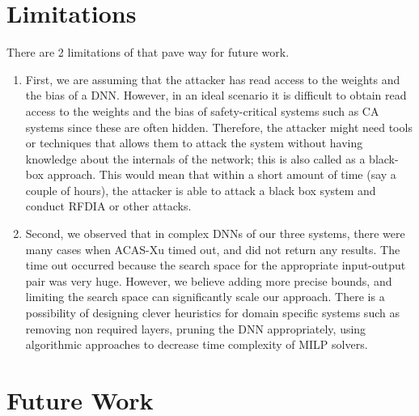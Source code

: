 \section{ Limitations}

There are 2 limitations of \tool that pave way for future work. 
\begin{enumerate}
	\item First, we are assuming that the attacker has read access to the weights and the bias of a \ac{DNN}.
	However, in an ideal scenario it is difficult to obtain read access to the weights and the bias of safety-critical systems such as \ac{CA} systems since these are often hidden.
	Therefore, the attacker might need tools or techniques that allows them to attack the system without having knowledge about the internals of the network; this is also called as a black-box approach. 
	This would mean that within a short amount of time (say a couple of hours), the attacker is able to attack a black box system and conduct \ac{RFDIA} or other attacks. 
	\item Second, we observed that in complex \ac{DNN}s of our three systems, there were many cases when  \ac{ACAS-Xu} timed out, and did not return any results. 
	The time out occurred because the search space for the appropriate input-output pair was very huge. 
	However, we believe adding more precise bounds, and limiting the search space can significantly scale our approach. 
	There is a possibility of designing clever heuristics for domain specific systems such as removing non required layers, pruning the \ac{DNN} appropriately, using algorithmic approaches to decrease time complexity of \ac{MILP} solvers. 
	
	\label{section:limitations}
	
\end{enumerate}

\section{ Future Work}

